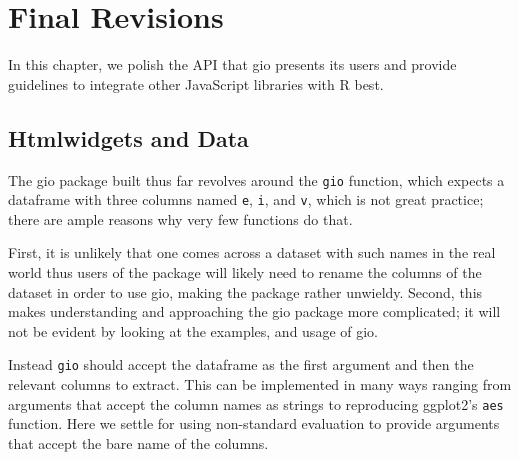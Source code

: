 \documentclass[10pt,]{krantz}
\begin{document}
\hypertarget{widgets-final}{%
\chapter{Final Revisions}\label{widgets-final}}

In this chapter, we polish the API that gio presents its users and provide guidelines to integrate other JavaScript libraries with R best.

\hypertarget{widgets-final-data}{%
\section{Htmlwidgets and Data}\label{widgets-final-data}}

The gio package built thus far revolves around the \texttt{gio} function, which expects a dataframe with three columns named \texttt{e}, \texttt{i}, and \texttt{v}, which is not great practice; there are ample reasons why very few functions do that.

First, it is unlikely that one comes across a dataset with such names in the real world thus users of the package will likely need to rename the columns of the dataset in order to use gio, making the package rather unwieldy. Second, this makes understanding and approaching the gio package more complicated; it will not be evident by looking at the examples, and usage of gio.

Instead \texttt{gio} should accept the dataframe as the first argument and then the relevant columns to extract. This can be implemented in many ways ranging from arguments that accept the column names as strings to reproducing ggplot2's \texttt{aes} function. Here we settle for using non-standard evaluation to provide arguments that accept the bare name of the columns.
\end{document}
